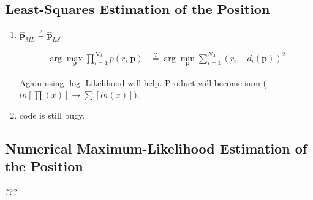 \documentclass[12pt,a4paper]{article}
\begin{document}
\subsection{Least-Squares Estimation of the Position}

\begin{enumerate}[1.]
  \item $\mathbf{\hat{p}}_{ML} \stackrel{?}{=} \mathbf{\hat{p}}_{LS}$

\begin{align*}
\arg\max_{\textbf{p}}\prod_{i=1}^{N_A}p(r_i|\textbf{p}) &\stackrel{?}{=}
\arg\min_{\textbf{p}}\sum_{i=1}^{N_A}(r_i-d_i(\textbf{p}))^2
\end{align*}

Again using $\log$-Likelihood will help. Product will become
sum\autocite[9]{lecuter_notes_spsc} ($ln[\prod(x)] \rightarrow \sum[ln(x)]$).

	\item code is still bugy.
	

\end{enumerate}

\subsection{Numerical Maximum-Likelihood Estimation of the Position}

???

\newpage
\printbibliography
\end{document}
